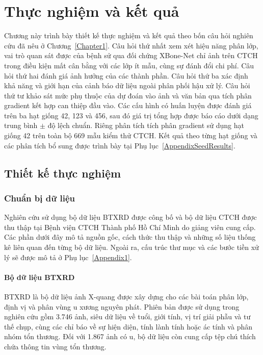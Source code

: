 \chapter{Thực nghiệm và kết quả}
\label{Chapter4}
Chương này trình bày thiết kế thực nghiệm và kết quả theo bốn câu hỏi nghiên cứu đã nêu ở Chương~\ref{Chapter1}. Câu hỏi thứ nhất xem xét hiệu năng phân lớp, vai trò quan sát được của bệnh sử qua đối chứng XBone-Net chỉ ảnh trên CTCH trong điều kiện mất cân bằng với các lớp ít mẫu, cùng sự đánh đổi chi phí. Câu hỏi thứ hai đánh giá ảnh hưởng của các thành phần. Câu hỏi thứ ba xác định khả năng và giới hạn của cảnh báo dữ liệu ngoài phân phối hậu xử lý. Câu hỏi thứ tư khảo sát mức phụ thuộc của dự đoán vào ảnh và văn bản qua tích phân gradient kết hợp can thiệp đầu vào. Các cấu hình có huấn luyện được đánh giá trên ba hạt giống 42, 123 và 456, sau đó giá trị tổng hợp được báo cáo dưới dạng trung bình $\pm$ độ lệch chuẩn. Riêng phân tích tích phân gradient sử dụng hạt giống 42 trên toàn bộ 669 mẫu kiểm thử CTCH. Kết quả theo từng hạt giống và các phân tích bổ sung được trình bày tại Phụ lục~\ref{AppendixSeedResults}.

\section{Thiết kế thực nghiệm}
\label{sec:experimental_design}

\subsection{Chuẩn bị dữ liệu}
Nghiên cứu sử dụng bộ dữ liệu BTXRD \cite{Yao2025} được công bố và bộ dữ liệu CTCH được thu thập tại Bệnh viện CTCH Thành phố Hồ Chí Minh do giảng viên cung cấp. Các phần dưới đây mô tả nguồn gốc, cách thức thu thập và những số liệu thống kê liên quan đến từng bộ dữ liệu. Ngoài ra, cấu trúc thư mục và các bước tiền xử lý sẽ được mô tả ở Phụ lục~\ref{Appendix1}.

\subsubsection{Bộ dữ liệu BTXRD}
\label{subsec:btxrd-dataset}

BTXRD là bộ dữ liệu ảnh X-quang được xây dựng cho các bài toán phân lớp, định vị và phân vùng u xương nguyên phát. Phiên bản được sử dụng trong nghiên cứu gồm 3.746 ảnh, siêu dữ liệu về tuổi, giới tính, vị trí giải phẫu và tư thế chụp, cùng các chỉ báo về sự hiện diện, tính lành tính hoặc ác tính và phân nhóm tổn thương. Đối với 1.867 ảnh có u, bộ dữ liệu còn cung cấp tệp chú thích chứa thông tin vùng tổn thương.

